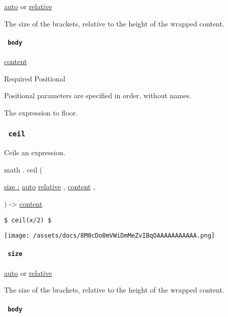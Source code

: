 \href{/docs/reference/foundations/auto/}{auto} {or}
\href{/docs/reference/layout/relative/}{relative}

The size of the brackets, relative to the height of the wrapped content.

\paragraph{\texorpdfstring{\texttt{\ body\ }}{ body }}\label{functions-floor-body}

\href{/docs/reference/foundations/content/}{content}

{Required} {{ Positional }}

\label{functions-floor-body-positional-tooltip}
Positional parameters are specified in order, without names.

The expression to floor.

\subsubsection{\texorpdfstring{\texttt{\ ceil\ }}{ ceil }}\label{functions-ceil}

Ceils an expression.

math { . } { ceil } (

{ \hyperref[functions-ceil-parameters-size]{size :}
\href{/docs/reference/foundations/auto/}{auto}
\href{/docs/reference/layout/relative/}{relative} , } {
\href{/docs/reference/foundations/content/}{content} , }

) -\textgreater{} \href{/docs/reference/foundations/content/}{content}

\begin{verbatim}
$ ceil(x/2) $
\end{verbatim}

\texttt{[image: /assets/docs/8M0cDo0mVWiDmMeZvIBqOAAAAAAAAAAA.png]}

\paragraph{\texorpdfstring{\texttt{\ size\ }}{ size }}\label{functions-ceil-size}

\href{/docs/reference/foundations/auto/}{auto} {or}
\href{/docs/reference/layout/relative/}{relative}

The size of the brackets, relative to the height of the wrapped content.

\paragraph{\texorpdfstring{\texttt{\ body\ }}{ body }}\label{functions-ceil-body}

